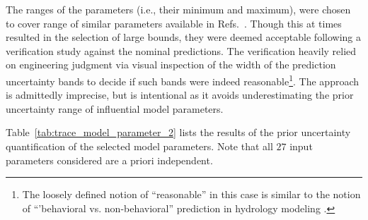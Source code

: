 The ranges of the parameters (i.e., their minimum and maximum), were chosen to cover range of similar parameters available in Refs.~\cite{Wickett1991,Glaeser2008a}.
Though this at times resulted in the selection of large bounds, they were deemed acceptable following a verification study against the nominal predictions.
The verification heavily relied on engineering judgment via visual inspection of the width of the prediction uncertainty bands to decide if such bands were indeed reasonable\footnote{The loosely defined notion of ``reasonable'' in this case is similar to the notion of ``'behavioral vs. non-behavioral'' prediction in hydrology modeling \cite{Beven2009}.}.
The approach is admittedly imprecise, but is intentional as it avoids underestimating the prior uncertainty range of influential model parameters. 

%
Table~\ref{tab:trace_model_parameter_2} lists the results of the prior uncertainty quantification of the selected model parameters.
Note that all $27$ input parameters considered are a priori independent.
